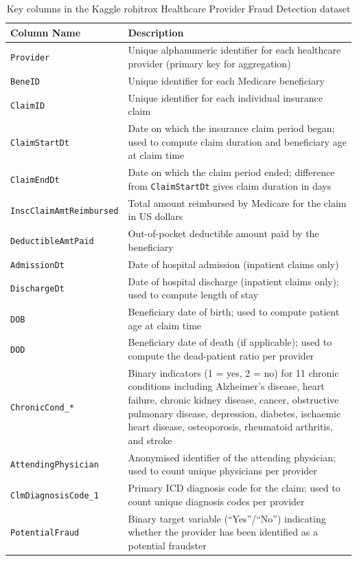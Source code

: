 \begin{table}[H]
\centering
\caption{Key columns in the Kaggle rohitrox Healthcare Provider Fraud Detection dataset}
\label{tab:dataset_features}
\begin{tabular}{p{4.5cm} p{9.5cm}}
\toprule
\textbf{Column Name} & \textbf{Description} \\
\midrule
\texttt{Provider} & Unique alphanumeric identifier for each healthcare provider (primary key for aggregation) \\
\texttt{BeneID} & Unique identifier for each Medicare beneficiary \\
\texttt{ClaimID} & Unique identifier for each individual insurance claim \\
\texttt{ClaimStartDt} & Date on which the insurance claim period began; used to compute claim duration and beneficiary age at claim time \\
\texttt{ClaimEndDt} & Date on which the claim period ended; difference from \texttt{ClaimStartDt} gives claim duration in days \\
{\footnotesize\texttt{InscClaimAmtReimbursed}} & Total amount reimbursed by Medicare for the claim in US dollars \\
\texttt{DeductibleAmtPaid} & Out-of-pocket deductible amount paid by the beneficiary \\
\texttt{AdmissionDt} & Date of hospital admission (inpatient claims only) \\
\texttt{DischargeDt} & Date of hospital discharge (inpatient claims only); used to compute length of stay \\
\texttt{DOB} & Beneficiary date of birth; used to compute patient age at claim time \\
\texttt{DOD} & Beneficiary date of death (if applicable); used to compute the dead-patient ratio per provider \\
\texttt{ChronicCond\_*} & Binary indicators (1 = yes, 2 = no) for 11 chronic conditions including Alzheimer's disease, heart failure, chronic kidney disease, cancer, obstructive pulmonary disease, depression, diabetes, ischaemic heart disease, osteoporosis, rheumatoid arthritis, and stroke \\
\texttt{AttendingPhysician} & Anonymised identifier of the attending physician; used to count unique physicians per provider \\
\texttt{ClmDiagnosisCode\_1} & Primary ICD diagnosis code for the claim; used to count unique diagnosis codes per provider \\
\texttt{PotentialFraud} & Binary target variable (``Yes''/``No'') indicating whether the provider has been identified as a potential fraudster \\
\bottomrule
\end{tabular}
\end{table}

